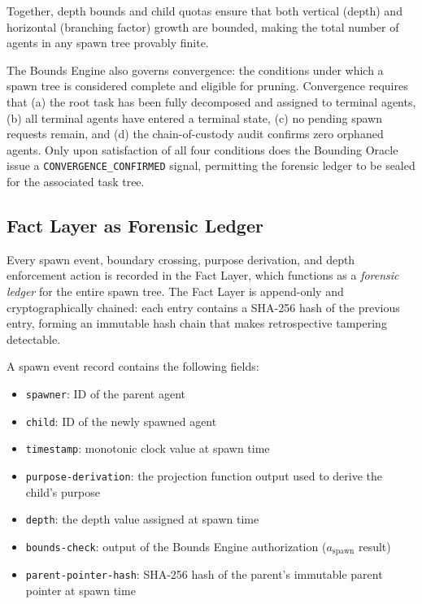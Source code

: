 Together, depth bounds and child quotas ensure that both vertical (depth) and horizontal (branching factor) growth are bounded, making the total number of agents in any spawn tree provably finite.

The Bounds Engine also governs convergence: the conditions under which a spawn tree is considered complete and eligible for pruning. Convergence requires that (a) the root task has been fully decomposed and assigned to terminal agents, (b) all terminal agents have entered a terminal state, (c) no pending spawn requests remain, and (d) the chain-of-custody audit confirms zero orphaned agents. Only upon satisfaction of all four conditions does the Bounding Oracle issue a \texttt{CONVERGENCE\_CONFIRMED} signal, permitting the forensic ledger to be sealed for the associated task tree.

\subsection{Fact Layer as Forensic Ledger}

Every spawn event, boundary crossing, purpose derivation, and depth enforcement action is recorded in the Fact Layer, which functions as a \textit{forensic ledger} for the entire spawn tree. The Fact Layer is append-only and cryptographically chained: each entry contains a SHA-256 hash of the previous entry, forming an immutable hash chain that makes retrospective tampering detectable.

A spawn event record contains the following fields:

\begin{itemize}
    \item \texttt{spawner}: ID of the parent agent
    \item \texttt{child}: ID of the newly spawned agent
    \item \texttt{timestamp}: monotonic clock value at spawn time
    \item \texttt{purpose-derivation}: the projection function output used to derive the child's purpose
    \item \texttt{depth}: the depth value assigned at spawn time
    \item \texttt{bounds-check}: output of the Bounds Engine authorization ($a_{\text{spawn}}$ result)
    \item \texttt{parent-pointer-hash}: SHA-256 hash of the parent's immutable parent pointer at spawn time
\end{itemize}

